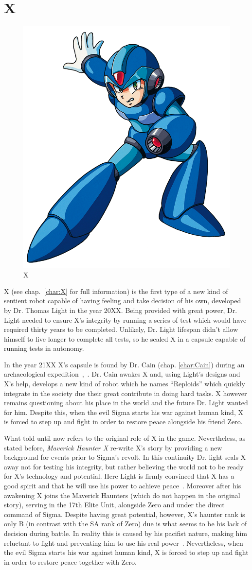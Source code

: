 \section{X}
\begin{figure}[htp]
	\centering
	\includegraphics[width=0.3\linewidth]{figures/X1/X_X1.png}
	\caption{X}
\end{figure}
X (see chap.~\ref{char:X} for full information) is the first type of a new kind of sentient robot capable of having feeling and take decision of his own, developed by Dr. Thomas Light in the year 20XX. Being provided with great power, Dr. Light needed to ensure X's integrity by running a series of test which would have required thirty years to be completed. Unlikely, Dr. Light lifespan didn't allow himself to live longer to complete all tests, so he sealed X in a capsule capable of running tests in autonomy.

In the year 21XX X's capsule is found by Dr. Cain (chap. \ref{char:Cain}) during an archaeological expedition~\cite{X:Manual},~\cite{wiki:Cain_journal}. Dr. Cain awakes X and, using Light's designs and X's help, develops a new kind of robot  which he names ``Reploids'' which quickly integrate in the society due their great contribute in doing hard tasks. X however remains questioning about his place in the world and the future Dr. Light wanted for him. Despite this, when the evil Sigma starts his war against human kind, X is forced to step up and fight in order to restore peace alongside his friend Zero. 

What told until now refers to the original role of X in the \x game. Nevertheless, as stated before, \textit{Maverick Haunter X} re-write X's story by providing a new background for events prior to Sigma's revolt. In this continuity Dr. light seals X away not for testing his integrity, but rather believing the world not to be ready for X's technology and potential. Here Light is firmly convinced that X has a good spirit and that he will use his power to achieve peace~\cite{wiki:MM_MHX_X}. Moreover after his awakening X joins the Maverick Haunters (which do not happen in the original story), serving in the 17th Elite Unit, alongside Zero and under the direct command of Sigma. Despite having great potential, however, X's haunter rank is only B (in contrast with the SA rank of Zero) due is what seems to be his lack of decision during battle. In reality this is caused by his pacifist nature, making him reluctant to fight and preventing him to use his real power~\cite{Xcoll1:Manual_X1}. Nevertheless, when the evil Sigma starts his war against human kind, X is forced to step up and fight in order to restore peace together with Zero.


